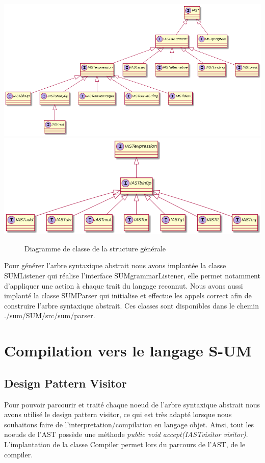 \documentclass[a4paper,12pt]{report}
\begin{document}
\begin{center}
 \includegraphics[scale=0.55]{./plantuml/ast_general_structure.png}
 \includegraphics[scale=0.70]{./plantuml/ast_binop_structure.png}
 \begin{figure}
  \caption{Diagramme de classe de la structure générale}
 \end{figure}
\end{center}

Pour générer l'arbre syntaxique abstrait nous avons implantée la classe SUMListener qui réalise l'interface SUMgrammarListener, elle
permet notamment d'appliquer une action à chaque trait du langage reconnut. Nous avons aussi implanté la classe SUMParser qui
initialise et effectue les appels correct afin de construire l'arbre syntaxique abstrait.
Ces classes sont disponibles dans le chemin ./sum/SUM/src/sum/parser.

\section{Compilation vers le langage S-UM}
\subsection{Design Pattern Visitor}
Pour pouvoir parcourir et traité chaque noeud de l'arbre syntaxique abstrait nous avons utilisé le design pattern visitor, ce qui est
très adapté lorsque nous souhaitons faire de l'interpretation/compilation en langage objet. Ainsi, tout les noeuds de l'AST possède
une méthode \textit{public void accept(IASTvisitor visitor)}. L'implantation de la classe Compiler permet lors du parcours de l'AST,
de le compiler.
\end{document}
